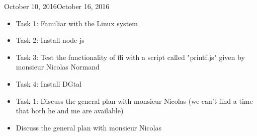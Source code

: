 \label{ann:WeeklyReports}


\begin{fichesuivi}{October 10, 2016}{October 16, 2016}
  
   \begin{travaileffectue}
      \begin{itemize}
         \item Task 1: Familiar with the Linux system
         \item Task 2: Install node js
         \item Task 3: Test the functionality of ffi with a script called "printf.js" given by monsieur Nicolas Normand 
         \item Task 4: Install DGtal
      \end{itemize}
   \end{travaileffectue}
   \begin{travailnoneffectue}
      \begin{itemize}
         \item Task 1:  Discuss the general plan with monsieur Nicolas (we can't find a time that both he and me are available)
      \end{itemize}
   \end{travailnoneffectue}

\begin{comment}
   \begin{echange}
      \begin{itemize}
         \item Questions;
         \item Answers;
         \item Clarification, comprehension;
         \item Choices, orientations, reorientations;
         \item Etc.
      \end{itemize}
   \end{echange}
\end{comment}

   \begin{planification}
      \begin{itemize}
         \item Discuss the general plan with monsieur Nicolas
      \end{itemize}
   \end{planification}
\end{fichesuivi}






